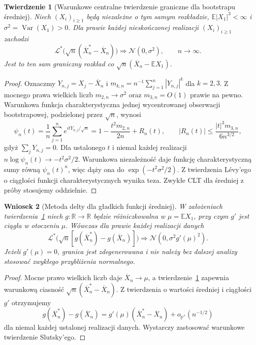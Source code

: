 \documentclass[11pt,a4paper,oneside]{report}
\numberwithin{equation}{chapter}
\theoremstyle{plain}
\newtheorem{twierdzenie}{Twierdzenie}[chapter]
\newtheorem{wniosek}[twierdzenie]{Wniosek}
\theoremstyle{definition}
\theoremstyle{remark}
\newcommand{\R}{\mathbb R}
\newcommand{\Prob}{\mathbb P}
\newcommand{\E}{\mathbb E}
\newcommand{\Var}{\operatorname{Var}}
\newcommand{\Normal}{\mathcal N}
\begin{document}
\begin{twierdzenie}[Warunkowe centralne twierdzenie graniczne dla bootstrapu średniej]
\label{thm:bootstrap-clt}
Niech $(X_i)_{i\ge1}$ będą niezależne o tym samym rozkładzie,
$\E|X_1|^3<\infty$ i $\sigma^2=\Var(X_1)>0$.
Dla prawie każdej nieskończonej realizacji $(X_i)_{i\ge1}$ zachodzi
\[
 \mathcal L^*\bigl(\sqrt n(\overline X_n^*-\overline X_n)\bigr)
 \Rightarrow\Normal(0,\sigma^2),\qquad n\to\infty.
\]
Jest to ten sam graniczny rozkład co $\sqrt n(\overline X_n-\E X_1)$.
\end{twierdzenie}
\begin{proof}
Oznaczmy $Y_{n,j}=X_j-\overline X_n$ i
$m_{k,n}=n^{-1}\sum_{j=1}^n|Y_{n,j}|^k$ dla $k=2,3$.
Z mocnego prawa wielkich liczb $m_{2,n}\to\sigma^2$
oraz $m_{3,n}=O(1)$ prawie na pewno.
Warunkowa funkcja charakterystyczna jednej wycentrowanej
obserwacji bootstrapowej, podzielonej przez $\sqrt n$, wynosi
\[
 \psi_n(t)=\frac1n\sum_{j=1}^n
 e^{itY_{n,j}/\sqrt n}
 =1-\frac{t^2m_{2,n}}{2n}+R_n(t),\qquad
 |R_n(t)|\le \frac{|t|^3m_{3,n}}{6n^{3/2}},
\]
gdyż $\sum_jY_{n,j}=0$. Dla ustalonego $t$ i niemal każdej
realizacji $n\log\psi_n(t)\to-t^2\sigma^2/2$.
Warunkowa niezależność daje funkcję charakterystyczną sumy
równą $\psi_n(t)^n$, więc dąży ona do
$\exp(-t^2\sigma^2/2)$. Z twierdzenia Lévy'ego
o ciągłości funkcji charakterystycznych wynika teza.
Zwykłe CLT dla średniej z próby stosujemy oddzielnie.
\end{proof}

\begin{wniosek}[Metoda delty dla gładkich funkcji średniej]
\label{cor:bootstrap-delta}
W założeniach twierdzenia~\ref{thm:bootstrap-clt} niech
$g\colon\R\to\R$ będzie różniczkowalna w
$\mu=\E X_1$, przy czym $g'$ jest ciągła w otoczeniu $\mu$.
Wówczas dla prawie każdej realizacji danych
\[
 \mathcal L^*\bigl(\sqrt n[g(\overline X_n^*)-g(\overline X_n)]\bigr)
 \Rightarrow \Normal(0,\sigma^2g'(\mu)^2).
\]
Jeżeli $g'(\mu)=0$, granica jest zdegenerowana i nie należy
bez dalszej analizy stosować zwykłego przybliżenia normalnego.
\end{wniosek}
\begin{proof}
Mocne prawo wielkich liczb daje $\overline X_n\to\mu$,
a twierdzenie~\ref{thm:bootstrap-clt} zapewnia warunkową
ciasność $\sqrt n(\overline X_n^*-\overline X_n)$.
Z twierdzenia o wartości średniej i ciągłości $g'$ otrzymujemy
\[
 g(\overline X_n^*)-g(\overline X_n)
 =g'(\mu)(\overline X_n^*-\overline X_n)
   +o_{\Prob^*}(n^{-1/2})
\]
dla niemal każdej ustalonej realizacji danych.
Wystarczy zastosować warunkowe twierdzenie Slutsky'ego.
\end{proof}
\end{document}
